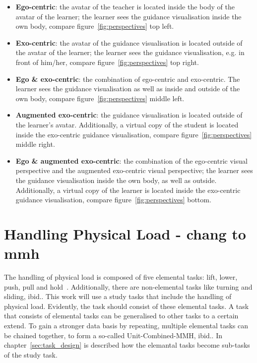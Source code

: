 \begin{itemize}
	\item \textbf{Ego-centric}: the avatar of the teacher is located inside the body of the avatar of the learner; the learner sees the guidance visualisation inside the own body, compare figure~\ref{fig:perspectives} top left.
	\item \textbf{Exo-centric}: the avatar of the guidance visualisation is located outside of the avatar of the learner; the learner sees the guidance visualisation, e.g. in front of him/her, compare figure~\ref{fig:perspectives} top right.
	\item \textbf{Ego \& exo-centric}: the combination of ego-centric and exo-centric. The learner sees the guidance visualisation as well as inside and outside of the own body, compare figure~\ref{fig:perspectives} middle left.
	\item \textbf{Augmented exo-centric}: the guidance visualisation is located outside of the learner's avatar. Additionally, a virtual copy of the student is located inside the exo-centric guidance visualisation, compare figure~\ref{fig:perspectives} middle right.
	\item \textbf{Ego \& augmented exo-centric}: the combination of the ego-centric visual perspective and the augmented exo-centric visual perspective; the learner sees the guidance visualisation inside the own body, as well as outside. Additionally, a virtual copy of the learner is located inside the exo-centric guidance visualisation, compare figure~\ref{fig:perspectives} bottom.	
\end{itemize}

\section{Handling Physical Load - chang to mmh}
\label{section:handlingphysicalload}
The handling of physical load is composed of five elemental tasks: lift, lower, push, pull and hold~\cite{mmh}. Additionally, there are non-elemental tasks like turning and sliding, ibid.. This work will use a study tasks that include the handling of physical load. Evidently, the task should consist of these elemental tasks. A task that consists of elemental tasks can be generalised to other tasks to a certain extend. To gain a stronger data basis by repeating, multiple elemental tasks can be chained together, to form a so-called Unit-Combined-MMH, ibid.. In chapter~\ref{sec:task_design} is described how the elemantal tasks become sub-tasks of the study task.

